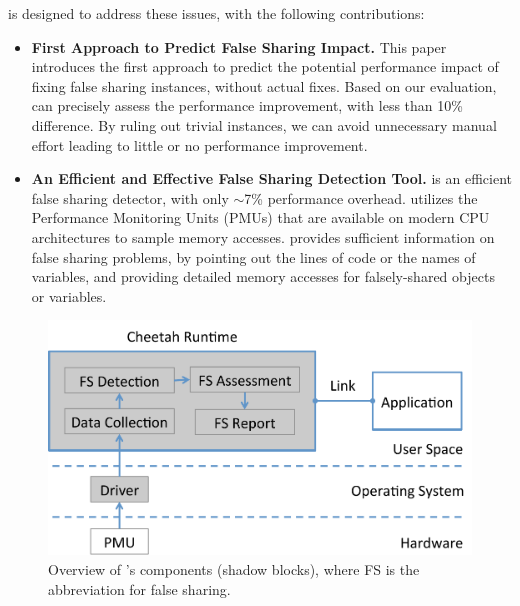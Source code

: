 \Cheetah{} is designed to address these issues, with the following contributions:
\begin{itemize} 

\item {\bf First Approach to Predict False Sharing Impact.} This paper introduces the first approach to predict the potential performance impact of fixing false sharing instances, without actual fixes. Based on our evaluation, \cheetah{} can precisely assess the performance improvement, with less than 10\% difference. By ruling out trivial instances, we can avoid unnecessary manual effort leading to little or no performance improvement. 

\item {\bf An Efficient and Effective False Sharing Detection Tool.} \cheetah{} is an efficient false sharing detector, with only $\sim$7\% performance overhead. \Cheetah{} utilizes the Performance Monitoring Units (PMUs) that are available on modern CPU architectures to sample memory accesses. \cheetah{} provides sufficient information on false sharing problems, by pointing out the lines of code or the names of variables, and providing detailed memory accesses for falsely-shared objects or variables. 
\end{itemize}

\begin{figure}[htbp]
\centering
\includegraphics[width=1\columnwidth]{figure/cheetahcomponents}
\caption{Overview of \cheetah{}'s components (shadow blocks), where FS is the abbreviation for false sharing.}
\label{fig:components}
\end{figure}


